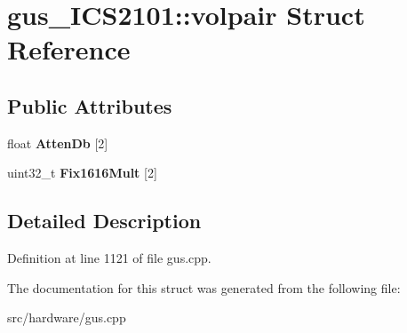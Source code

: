\hypertarget{structgus__ICS2101_1_1volpair}{\section{gus\-\_\-\-I\-C\-S2101\-:\-:volpair Struct Reference}
\label{structgus__ICS2101_1_1volpair}
}
\subsection*{Public Attributes}
\begin{DoxyCompactItemize}
\item 
\hypertarget{structgus__ICS2101_1_1volpair_a02314a3a3ad17a789bc194f027a55728}{float {\bfseries Atten\-Db} \mbox{[}2\mbox{]}}\label{structgus__ICS2101_1_1volpair_a02314a3a3ad17a789bc194f027a55728}

\item 
\hypertarget{structgus__ICS2101_1_1volpair_a46cbc4d1df89d680f55e3bc2ab41baca}{uint32\-\_\-t {\bfseries Fix1616\-Mult} \mbox{[}2\mbox{]}}\label{structgus__ICS2101_1_1volpair_a46cbc4d1df89d680f55e3bc2ab41baca}

\end{DoxyCompactItemize}


\subsection{Detailed Description}


Definition at line 1121 of file gus.\-cpp.



The documentation for this struct was generated from the following file\-:\begin{DoxyCompactItemize}
\item 
src/hardware/gus.\-cpp\end{DoxyCompactItemize}
